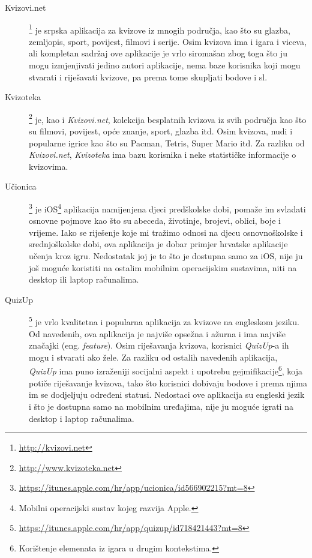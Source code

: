 \documentclass{scrreprt}
\begin{document}
\begin{description}

  \item[Kvizovi.net]\footnote{\url{http://kvizovi.net}} je srpska aplikacija za
    kvizove iz mnogih područja, kao što su glazba, zemljopis, sport, povijest,
    filmovi i serije. Osim kvizova ima i igara i viceva, ali kompletan sadržaj
    ove aplikacije je vrlo siromašan zbog toga što ju mogu izmjenjivati jedino
    autori aplikacije, nema baze korisnika koji mogu stvarati i riješavati
    kvizove, pa prema tome skupljati bodove i sl.

  \item[Kvizoteka]\footnote{\url{http://www.kvizoteka.net}} je, kao i
    \emph{Kvizovi.net}, kolekcija besplatnih kvizova iz svih područja kao što su
    filmovi, povijest, opće znanje, sport, glazba itd. Osim kvizova, nudi i
    popularne igrice kao što su Pacman, Tetris, Super Mario itd. Za razliku od
    \emph{Kvizovi.net}, \emph{Kvizoteka} ima bazu korisnika i neke statističke
    informacije o kvizovima.

  \item[Učionica]\footnote{\url{https://itunes.apple.com/hr/app/ucionica/id566902215?mt=8}}
    je iOS\footnote{Mobilni operacijski sustav kojeg razvija Apple.} aplikacija
    namijenjena djeci predškolske dobi, pomaže im svladati osnovne pojmove kao
    što su abeceda, životinje, brojevi, oblici, boje i vrijeme. Iako se
    riješenje koje mi tražimo odnosi na djecu osnovnoškolske i srednjoškolske
    dobi, ova aplikacija je dobar primjer hrvatske aplikacije učenja kroz igru.
    Nedostatak joj je to što je dostupna samo za iOS, nije ju još moguće
    koristiti na ostalim mobilnim operacijskim sustavima, niti na desktop ili
    laptop računalima.

  \item[QuizUp]\footnote{\url{https://itunes.apple.com/hr/app/quizup/id718421443?mt=8}}
    je vrlo kvalitetna i popularna aplikacija za kvizove na engleskom jeziku. Od
    navedenih, ova aplikacija je najviše opsežna i ažurna i ima najviše značajki
    (eng. \emph{feature}). Osim riješavanja kvizova, korisnici \emph{QuizUp}-a
    ih mogu i stvarati ako žele. Za razliku od ostalih navedenih aplikacija,
    \emph{QuizUp} ima puno izraženiji socijalni aspekt i upotrebu
    gejmifikacije\footnote{Korištenje elemenata iz igara u drugim kontekstima.},
    koja potiče riješavanje kvizova, tako što korisnici dobivaju bodove i prema
    njima im se dodjeljuju određeni statusi. Nedostaci ove aplikacija su
    engleski jezik i što je dostupna samo na mobilnim uređajima, nije ju moguće
    igrati na desktop i laptop računalima.

\end{description}
\end{document}
